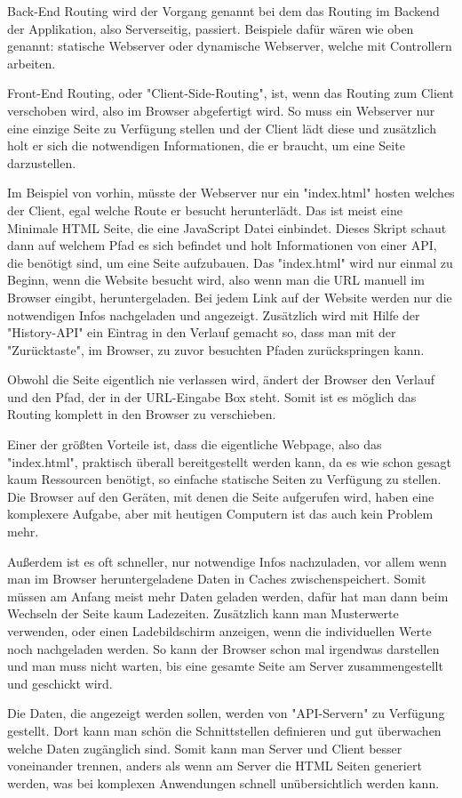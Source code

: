 
Back-End Routing wird der Vorgang genannt bei dem das Routing im Backend der Applikation, also Serverseitig, passiert. Beispiele dafür wären wie oben genannt: statische Webserver oder dynamische Webserver, welche mit Controllern arbeiten.


Front-End Routing, oder "Client-Side-Routing", ist, wenn das Routing zum Client verschoben wird, also im Browser abgefertigt wird. So muss ein Webserver nur eine einzige Seite zu Verfügung stellen und der Client lädt diese und zusätzlich holt er sich die notwendigen Informationen, die er braucht, um eine Seite darzustellen.

Im Beispiel von vorhin, müsste der Webserver nur ein "index.html" hosten welches der Client, egal welche Route er besucht herunterlädt. Das ist meist eine Minimale HTML Seite, die eine JavaScript Datei einbindet. Dieses Skript schaut dann auf welchem Pfad es sich befindet und holt Informationen von einer API, die benötigt sind, um eine Seite aufzubauen. Das "index.html" wird nur einmal zu Beginn, wenn die Website besucht wird, also wenn man die URL manuell im Browser eingibt, heruntergeladen. Bei jedem Link auf der Website werden nur die notwendigen Infos nachgeladen und angezeigt. Zusätzlich wird mit Hilfe der "History-API" ein Eintrag in den Verlauf gemacht so, dass man mit der "Zurücktaste", im Browser, zu zuvor besuchten Pfaden zurückspringen kann.

Obwohl die Seite eigentlich nie verlassen wird, ändert der Browser den Verlauf und den Pfad, der in der URL-Eingabe Box steht. Somit ist es möglich das Routing komplett in den Browser zu verschieben.


Einer der größten Vorteile ist, dass die eigentliche Webpage, also das "index.html", praktisch überall bereitgestellt werden kann, da es wie schon gesagt kaum Ressourcen benötigt, so einfache statische Seiten zu Verfügung zu stellen. Die Browser auf den Geräten, mit denen die Seite aufgerufen wird, haben eine komplexere Aufgabe, aber mit heutigen Computern ist das auch kein Problem mehr.

Außerdem ist es oft schneller, nur notwendige Infos nachzuladen, vor allem wenn man im Browser heruntergeladene Daten in Caches zwischenspeichert. Somit müssen am Anfang meist mehr Daten geladen werden, dafür hat man dann beim Wechseln der Seite kaum Ladezeiten. Zusätzlich kann man Musterwerte verwenden, oder einen Ladebildschirm anzeigen, wenn die individuellen Werte noch nachgeladen werden. So kann der Browser schon mal irgendwas darstellen und man muss nicht warten, bis eine gesamte Seite am Server zusammengestellt und geschickt wird.

Die Daten, die angezeigt werden sollen, werden von "API-Servern" zu Verfügung gestellt. Dort kann man schön die Schnittstellen definieren und gut überwachen welche Daten zugänglich sind. Somit kann man Server und Client besser voneinander trennen, anders als wenn am Server die HTML Seiten generiert werden, was bei komplexen Anwendungen schnell unübersichtlich werden kann.

